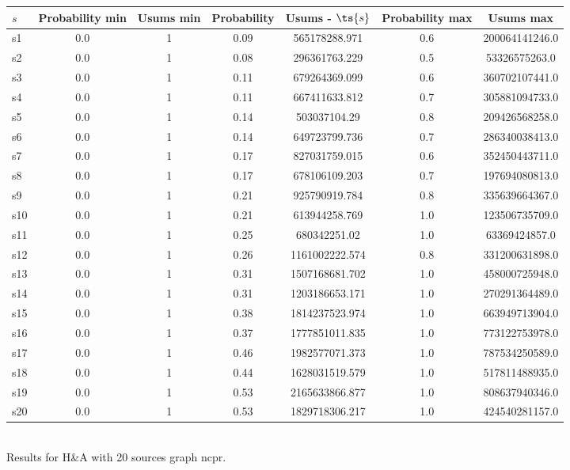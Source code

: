 \documentclass{article}
\begin{document}
\noindent\begin{tabular}{|l|c|c|c|c|c|c|}
\hline
$s$& Probability min & Usums min & Probability & Usums - $\ts{s}$ & Probability max & Usums max\\
\hline
s1 &0.0 & 1 & 0.09 & 565178288.971 & 0.6 & 200064141246.0\\
\hline
s2 &0.0 & 1 & 0.08 & 296361763.229 & 0.5 & 53326575263.0\\
\hline
s3 &0.0 & 1 & 0.11 & 679264369.099 & 0.6 & 360702107441.0\\
\hline
s4 &0.0 & 1 & 0.11 & 667411633.812 & 0.7 & 305881094733.0\\
\hline
s5 &0.0 & 1 & 0.14 & 503037104.29 & 0.8 & 209426568258.0\\
\hline
s6 &0.0 & 1 & 0.14 & 649723799.736 & 0.7 & 286340038413.0\\
\hline
s7 &0.0 & 1 & 0.17 & 827031759.015 & 0.6 & 352450443711.0\\
\hline
s8 &0.0 & 1 & 0.17 & 678106109.203 & 0.7 & 197694080813.0\\
\hline
s9 &0.0 & 1 & 0.21 & 925790919.784 & 0.8 & 335639664367.0\\
\hline
s10 &0.0 & 1 & 0.21 & 613944258.769 & 1.0 & 123506735709.0\\
\hline
s11 &0.0 & 1 & 0.25 & 680342251.02 & 1.0 & 63369424857.0\\
\hline
s12 &0.0 & 1 & 0.26 & 1161002222.574 & 0.8 & 331200631898.0\\
\hline
s13 &0.0 & 1 & 0.31 & 1507168681.702 & 1.0 & 458000725948.0\\
\hline
s14 &0.0 & 1 & 0.31 & 1203186653.171 & 1.0 & 270291364489.0\\
\hline
s15 &0.0 & 1 & 0.38 & 1814237523.974 & 1.0 & 663949713904.0\\
\hline
s16 &0.0 & 1 & 0.37 & 1777851011.835 & 1.0 & 773122753978.0\\
\hline
s17 &0.0 & 1 & 0.46 & 1982577071.373 & 1.0 & 787534250589.0\\
\hline
s18 &0.0 & 1 & 0.44 & 1628031519.579 & 1.0 & 517811488935.0\\
\hline
s19 &0.0 & 1 & 0.53 & 2165633866.877 & 1.0 & 808637940346.0\\
\hline
s20 &0.0 & 1 & 0.53 & 1829718306.217 & 1.0 & 424540281157.0\\
\hline
\end{tabular}\\

\noindent Results for H\&A with 20 sources graph ncpr.
\end{document}
